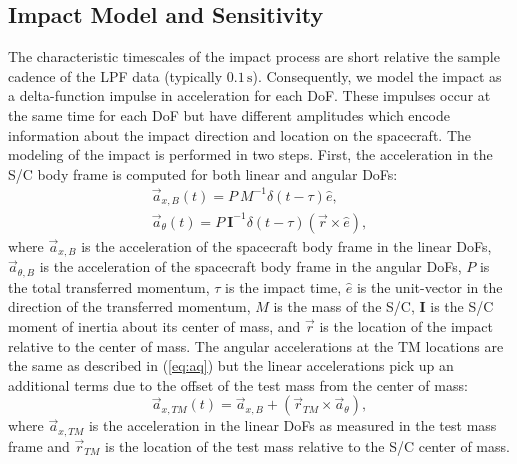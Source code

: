 \documentclass[twocolumn, trackchanges]{aastex62}
\begin{document}

\subsection{Impact Model and Sensitivity}
\label{sec:sensitivity}
The characteristic timescales of the impact process are short relative the sample cadence of the LPF data (typically $0.1\,\textrm{s}$). Consequently, we model the impact as a delta-function impulse in acceleration for each DoF.  These impulses occur at the same time for each DoF but have different amplitudes which encode information about the impact direction and location on the spacecraft. The modeling of the impact is performed in two steps. First, the acceleration in the S/C body frame is computed for both linear and angular DoFs:
\begin{eqnarray}
\vec{a}_{x,B}(t) = P\:M^{-1}\delta(t-\tau) \hat{e},\label{eq:axB} \\
\vec{a}_{\theta}(t)= P\:\mathbf{I}^{-1}\delta(t-\tau)\left(\vec{r}\times\hat{e}\right), \label{eq:aq}
\end{eqnarray}
where $\vec{a}_{x,B}$ is the acceleration of the spacecraft body frame in the linear DoFs, $\vec{a}_{\theta,B}$ is the acceleration of the spacecraft body frame in the angular DoFs, $P$ is the total transferred momentum, $\tau$ is the impact time, $\hat{e}$ is the unit-vector in the direction of the transferred momentum, $M$ is the mass of the S/C, $\mathbf{I}$ is the S/C moment of inertia about its center of mass, and $\vec{r}$ is the location of the impact relative to the center of mass. The angular accelerations at the TM locations are the same as described in (\ref{eq:aq}) but the linear accelerations pick up an additional terms due to the offset of the test mass from the center of mass:
\begin{equation}
\vec{a}_{x,TM}(t) = \vec{a}_{x,B} + \left(\vec{r}_{TM}\times \vec{a}_{\theta}\right),\label{eq:axTM}
\end{equation}
where $\vec{a}_{x,TM}$ is the acceleration in the linear DoFs as measured in the test mass frame and $\vec{r}_{TM}$ is the location of the test mass relative to the S/C center of mass.
\end{document}
